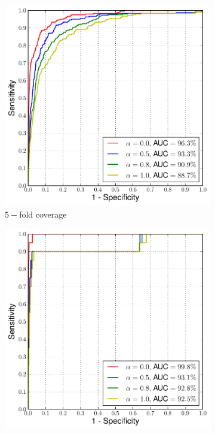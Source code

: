  \begin{figure}
\centering
\begin{subfigure}{.33\textwidth}
  \centering
  \includegraphics[width=\linewidth]{figures/5fold-b}
  \caption{$5-$fold coverage}
\end{subfigure}%
\begin{subfigure}{.33\textwidth}
  \centering
  \includegraphics[width=\linewidth]{figures/10fold-b}

\end{subfigure}
\end{figure}
